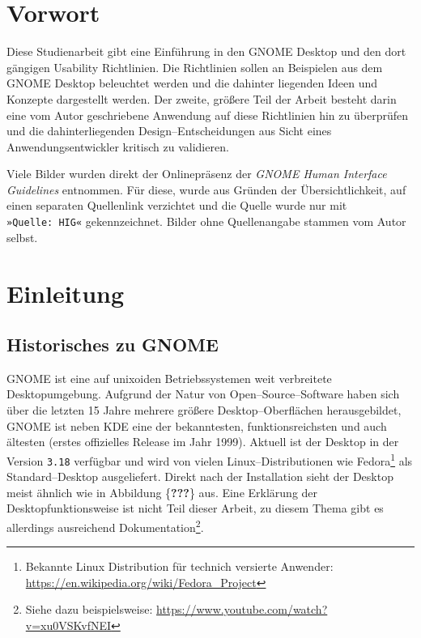 \documentclass[11pt,ngerman,toc=listof,index=totoc]{scrreprt}
\begin{document}
{
\setcounter{tocdepth}{2}
\tableofcontents
}
\listoffigures
{} \setcounter{page}{1}

\chapter{Vorwort}\label{vorwort}

Diese Studienarbeit gibt eine Einführung in den GNOME Desktop und den
dort gängigen Usability Richtlinien. Die Richtlinien sollen an
Beispielen aus dem GNOME Desktop beleuchtet werden und die dahinter
liegenden Ideen und Konzepte dargestellt werden. Der zweite, größere
Teil der Arbeit besteht darin eine vom Autor geschriebene Anwendung auf
diese Richtlinien hin zu überprüfen und die dahinterliegenden
Design--Entscheidungen aus Sicht eines Anwendungsentwickler kritisch zu
validieren.

Viele Bilder wurden direkt der Onlinepräsenz der \emph{GNOME Human
Interface Guidelines} entnommen. Für diese, wurde aus Gründen der
Übersichtlichkeit, auf einen separaten Quellenlink verzichtet und die
Quelle wurde nur mit \texttt{»Quelle:\ HIG«} gekennzeichnet. Bilder ohne
Quellenangabe stammen vom Autor selbst.

\chapter{Einleitung}\label{einleitung}

\section{Historisches zu GNOME}\label{historisches-zu-gnome}

GNOME ist eine auf unixoiden Betriebssystemen weit verbreitete
Desktopumgebung. Aufgrund der Natur von Open--Source--Software haben
sich über die letzten 15 Jahre mehrere größere Desktop--Oberflächen
herausgebildet, GNOME ist neben KDE eine der bekanntesten,
funktionsreichsten und auch ältesten (erstes offizielles Release im Jahr
1999). Aktuell ist der Desktop in der Version \texttt{3.18} verfügbar
und wird von vielen Linux--Distributionen wie Fedora\footnote{Bekannte
  Linux Distribution für technich versierte Anwender:
  \url{https://en.wikipedia.org/wiki/Fedora_Project}} als
Standard--Desktop ausgeliefert. Direkt nach der Installation sieht der
Desktop meist ähnlich wie in Abbildung \{\textbf{???}\} aus. Eine
Erklärung der Desktopfunktionsweise ist nicht Teil dieser Arbeit, zu
diesem Thema gibt es allerdings ausreichend Dokumentation\footnote{Siehe
  dazu beispielsweise: \url{https://www.youtube.com/watch?v=xu0VSKvfNEI}}.
\end{document}
